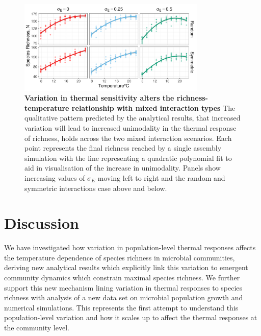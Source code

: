 \documentclass{article}
\begin{document}
\begin{figure}
    \centering
    \includegraphics[width = 0.8\textwidth]{docs/Figures/Fig_mixed.pdf}
    \caption{\textbf{Variation in thermal sensitivity alters the richness-temperature relationship with mixed interaction types} The qualitative pattern predicted by the analytical results, that increased variation will lead to increased unimodality in the thermal response of richness, holds across the two mixed interaction scenarios. Each point represents the final richness reached by a single assembly simulation with the line representing a quadratic polynomial fit to aid in visualisation  of the increase in unimodality. Panels show increasing values of $\sigma_E$ moving left to right and the random and symmetric interactions case above and below.}
    \label{Fig:Temperature_assembly_mixed}
\end{figure}

\newpage

\section*{Discussion}
We have investigated how variation in population-level thermal responses affects the temperature dependence of species richness in microbial communities, deriving new analytical results which explicitly link this variation to emergent community dynamics which constrain maximal species richness. We further support this new mechanism lining variation in thermal responses to species richness with analysis of a new data set on microbial population growth and numerical simulations. This represents the first attempt to understand this population-level variation and how it scales up to affect the thermal responses at the community level. 
\end{document}
